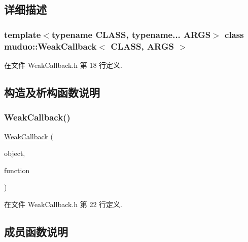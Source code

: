 \subsection{详细描述}
\subsubsection*{template$<$typename C\+L\+A\+SS, typename... A\+R\+GS$>$\newline
class muduo\+::\+Weak\+Callback$<$ C\+L\+A\+S\+S, A\+R\+G\+S $>$}



在文件 Weak\+Callback.\+h 第 18 行定义.



\subsection{构造及析构函数说明}
\mbox{\label{classmuduo_1_1WeakCallback_aa8d539f1d3b426a86729585dfdae788d}} 
\subsubsection{\texorpdfstring{Weak\+Callback()}{WeakCallback()}}
{\footnotesize\ttfamily \hyperlink{classmuduo_1_1WeakCallback}{Weak\+Callback} (\begin{DoxyParamCaption}\item[{const std\+::weak\+\_\+ptr$<$ C\+L\+A\+SS $>$ \&}]{object,  }\item[{const std\+::function$<$ void(C\+L\+A\+SS $\ast$, A\+R\+G\+S...)$>$ \&}]{function }\end{DoxyParamCaption})\hspace{0.3cm}{\ttfamily [inline]}}



在文件 Weak\+Callback.\+h 第 22 行定义.



\subsection{成员函数说明}
\mbox{\label{classmuduo_1_1WeakCallback_a921a43a7ebf225a0e20ac206789d6cd5}} 
